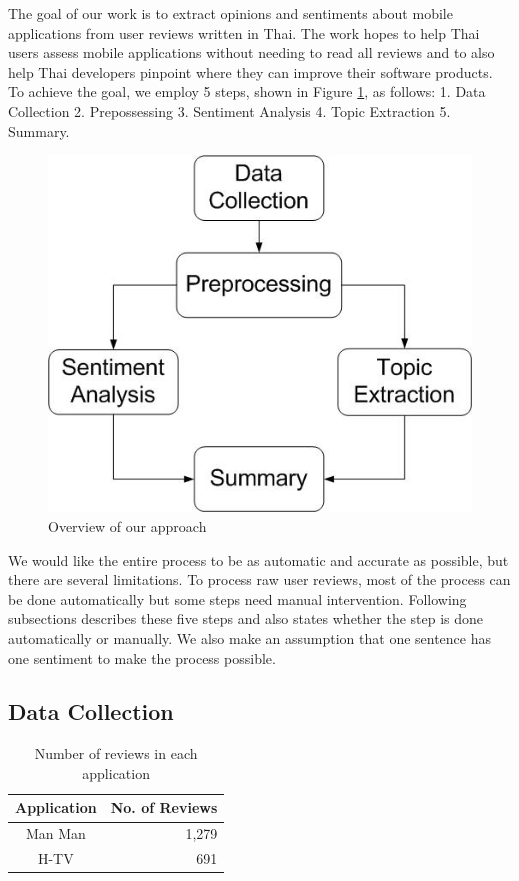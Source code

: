 
The goal of our work is to extract opinions and sentiments about mobile applications from user reviews written in Thai. The work hopes to help Thai users assess mobile applications without needing to read all reviews and to also help Thai developers pinpoint where they can improve their software products. To achieve the goal, we employ 5 steps, shown in Figure \ref{fig:approachFig}, as follows: 1. Data Collection 2. Prepossessing 3. Sentiment Analysis 4. Topic Extraction 5. Summary. 

\begin{figure}[t]
	\centering
	\includegraphics[width=.5\linewidth]{Process.jpg}
	\caption{Overview of our approach}
	\label{fig:approachFig}
\end{figure}

We would like the entire process to be as automatic and accurate as possible, but there are several limitations. To process raw user reviews, most of the process can be done automatically but some steps need manual intervention. Following subsections describes these five steps and also states whether the step is done automatically or manually. We also make an assumption that one sentence has one sentiment to make the process possible. 

\subsection{Data Collection}

\begin{table}[h]
	\caption{Number of reviews in each application}
	\label{table:NoOfReview}
	\centering
	\begin{tabular}{|c|r|}
		\hline
		\textbf{Application} & \multicolumn{1}{|c|}{\textbf{No. of Reviews}} \\
		\hline
		Man Man & 1,279\\
		\hline
		H-TV & 691\\
		\hline
	\end{tabular}
\end{table}

